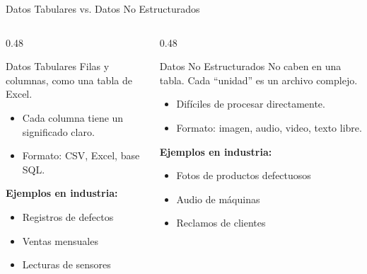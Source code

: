 \documentclass[aspectratio=169]{beamer}
\begin{document}
\begin{frame}{Datos Tabulares vs. Datos No Estructurados}
  \small
  \begin{columns}[T]
    \begin{column}{0.48\textwidth}
      \begin{block}{\faTable\enspace Datos Tabulares}
        \small
        Filas y columnas, como una tabla de Excel.
        \vspace{4pt}
        \begin{itemize}\setlength\itemsep{2pt}
          \item Cada columna tiene un significado claro.
          \item Formato: CSV, Excel, base SQL.
        \end{itemize}
        \vspace{4pt}
        \textbf{Ejemplos en industria:}
        \begin{itemize}\setlength\itemsep{1pt}
          \item Registros de defectos \checkmark
          \item Ventas mensuales
          \item Lecturas de sensores
        \end{itemize}
      \end{block}
    \end{column}
    \begin{column}{0.48\textwidth}
      \begin{block}{\faImages\enspace Datos No Estructurados}
        \small
        No caben en una tabla. Cada ``unidad'' es un archivo complejo.
        \vspace{4pt}
        \begin{itemize}\setlength\itemsep{2pt}
          \item Difíciles de procesar directamente.
          \item Formato: imagen, audio, video, texto libre.
        \end{itemize}
        \vspace{4pt}
        \textbf{Ejemplos en industria:}
        \begin{itemize}\setlength\itemsep{1pt}
          \item Fotos de productos defectuosos
          \item Audio de máquinas
          \item Reclamos de clientes

\end{itemize}
\end{block}
\end{column}
\end{columns}
\end{frame}
\end{document}
